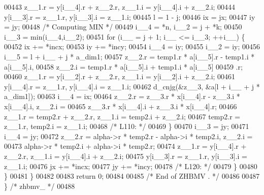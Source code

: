 \begin{DoxyCode}
00443         z\_\_1.r = y[i\_\_4].r + z\_\_2.r, z\_\_1.i = y[i\_\_4].i + z\_\_2.i;
00444         y[i\_\_3].r = z\_\_1.r, y[i\_\_3].i = z\_\_1.i;
00445         l = 1 - j;
00446         ix = jx;
00447         iy = jy;
00448 \textcolor{comment}{/* Computing MIN */}
00449         i\_\_4 = *n, i\_\_2 = j + *k;
00450         i\_\_3 = min(i\_\_4,i\_\_2);
00451         \textcolor{keywordflow}{for} (i\_\_ = j + 1; i\_\_ <= i\_\_3; ++i\_\_) \{
00452             ix += *incx;
00453             iy += *incy;
00454             i\_\_4 = iy;
00455             i\_\_2 = iy;
00456             i\_\_5 = l + i\_\_ + j * a\_dim1;
00457             z\_\_2.r = temp1.r * a[i\_\_5].r - temp1.i * a[i\_\_5].i, 
00458                 z\_\_2.i = temp1.r * a[i\_\_5].i + temp1.i * a[i\_\_5]
00459                 .r;
00460             z\_\_1.r = y[i\_\_2].r + z\_\_2.r, z\_\_1.i = y[i\_\_2].i + z\_\_2.i;
00461             y[i\_\_4].r = z\_\_1.r, y[i\_\_4].i = z\_\_1.i;
00462             d\_cnjg(&z\_\_3, &a[l + i\_\_ + j * a\_dim1]);
00463             i\_\_4 = ix;
00464             z\_\_2.r = z\_\_3.r * x[i\_\_4].r - z\_\_3.i * x[i\_\_4].i, z\_\_2.i =
00465                  z\_\_3.r * x[i\_\_4].i + z\_\_3.i * x[i\_\_4].r;
00466             z\_\_1.r = temp2.r + z\_\_2.r, z\_\_1.i = temp2.i + z\_\_2.i;
00467             temp2.r = z\_\_1.r, temp2.i = z\_\_1.i;
00468 \textcolor{comment}{/* L110: */}
00469         \}
00470         i\_\_3 = jy;
00471         i\_\_4 = jy;
00472         z\_\_2.r = alpha->r * temp2.r - alpha->i * temp2.i, z\_\_2.i = 
00473             alpha->r * temp2.i + alpha->i * temp2.r;
00474         z\_\_1.r = y[i\_\_4].r + z\_\_2.r, z\_\_1.i = y[i\_\_4].i + z\_\_2.i;
00475         y[i\_\_3].r = z\_\_1.r, y[i\_\_3].i = z\_\_1.i;
00476         jx += *incx;
00477         jy += *incy;
00478 \textcolor{comment}{/* L120: */}
00479         \}
00480     \}
00481     \}
00482 
00483     \textcolor{keywordflow}{return} 0;
00484 
00485 \textcolor{comment}{/*     End of ZHBMV . */}
00486 
00487 \} \textcolor{comment}{/* zhbmv\_ */}
00488 
\end{DoxyCode}
